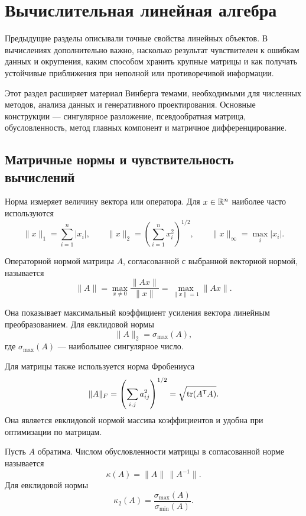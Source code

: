 \section{Вычислительная линейная алгебра}
\label{sec:computational-linear-algebra}

Предыдущие разделы описывали точные свойства линейных объектов. В вычислениях дополнительно важно, насколько результат чувствителен к ошибкам данных и округления, каким способом хранить крупные матрицы и как получать устойчивые приближения при неполной или противоречивой информации.

Этот раздел расширяет материал Винберга темами, необходимыми для численных методов, анализа данных и генеративного проектирования. Основные конструкции --- сингулярное разложение, псевдообратная матрица, обусловленность, метод главных компонент и матричное дифференцирование.

\subsection{Матричные нормы и чувствительность вычислений}

Норма измеряет величину вектора или оператора. Для \(x\in\mathbb{R}^n\) наиболее часто используются
\[
\|x\|_1=\sum_{i=1}^{n}|x_i|,
\qquad
\|x\|_2=\left(\sum_{i=1}^{n}x_i^2\right)^{1/2},
\qquad
\|x\|_\infty=\max_i|x_i|.
\]

\begin{definition}
Операторной нормой матрицы \(A\), согласованной с выбранной векторной нормой, называется
\[
\|A\|
=
\max_{x\neq0}\frac{\|Ax\|}{\|x\|}
=
\max_{\|x\|=1}\|Ax\|.
\]
\end{definition}

Она показывает максимальный коэффициент усиления вектора линейным преобразованием. Для евклидовой нормы
\[
\|A\|_2=\sigma_{\max}(A),
\]
где \(\sigma_{\max}(A)\) --- наибольшее сингулярное число.

Для матрицы также используется норма Фробениуса
\[
\|A\|_F
=
\left(\sum_{i,j}a_{ij}^2\right)^{1/2}
=
\sqrt{\operatorname{tr}(A^{\mathsf{T}}A)}.
\]
Она является евклидовой нормой массива коэффициентов и удобна при оптимизации по матрицам.

\begin{definition}
Пусть \(A\) обратима. Числом обусловленности матрицы в согласованной норме называется
\[
\kappa(A)=\|A\|\,\|A^{-1}\|.
\]
Для евклидовой нормы
\[
\kappa_2(A)
=
\frac{\sigma_{\max}(A)}{\sigma_{\min}(A)}.
\]
\end{definition}


